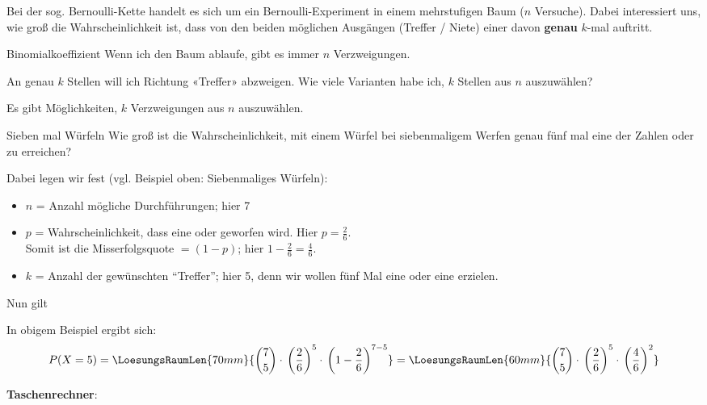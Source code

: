 Bei der sog. Bernoulli-Kette handelt es sich um ein
Bernoulli-Experiment
in einem mehrstufigen Baum ($n$ Versuche). Dabei interessiert
uns, wie groß die Wahrscheinlichkeit ist, dass von den beiden
möglichen Ausgängen (Treffer / Niete) einer davon \textbf{genau} $k$-mal auftritt.

\begin{bemerkung}{Binomialkoeffizient}{}
  Wenn ich den Baum ablaufe, gibt es immer $n$ Verzweigungen.

  An genau $k$
Stellen will ich Richtung «Treffer» abzweigen. Wie viele Varianten
habe ich, $k$ Stellen aus $n$ auszuwählen?

\vspace{4mm}

Es gibt  Möglichkeiten, $k$ Verzweigungen aus
$n$ auszuwählen.
\end{bemerkung}

\newpage
\begin{beispiel}{Sieben mal Würfeln}{}
Wie groß ist die Wahrscheinlichkeit, mit einem Würfel bei
siebenmaligem Werfen genau fünf mal eine der Zahlen  oder
 zu erreichen?
\end{beispiel}
Dabei legen wir fest (vgl. Beispiel oben: Siebenmaliges Würfeln):
\begin{itemize}

\item
  $n$ = Anzahl mögliche Durchführungen; hier 7

\item
  $p$ = Wahrscheinlichkeit, dass eine  oder 
  geworfen wird. Hier $p = \frac26$.\\
  Somit ist die Misserfolgsquote $= (1-p)$; hier $1-\frac26=\frac46$.


\item
  $k$ = Anzahl der gewünschten ``Treffer''; hier 5, denn wir wollen fünf
Mal eine  oder eine  erzielen.
\end{itemize}

Nun gilt

In obigem Beispiel ergibt sich:
\vspace{2mm}
$$P(X=5) = \LoesungsRaumLen{70mm}{{7\choose 5} \cdot{}
  \left(\frac26\right)^5 \cdot{} \left(1-\frac26\right)^{7-5}} =
\LoesungsRaumLen{60mm}{{7\choose 5} \cdot{} \left(\frac26\right)^5
  \cdot{} \left(\frac46\right)^2}$$


\textbf{Taschenrechner}:

\leserluft


